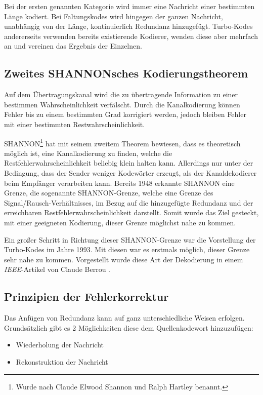 Bei der ersten genannten Kategorie wird immer eine Nachricht einer bestimmten Länge kodiert. Bei Faltungskodes wird hingegen der ganzen Nachricht, unabhängig von der Länge, kontinuierlich Redundanz hinzugefügt. Turbo-Kodes andererseits verwenden bereits existierende Kodierer, wenden diese aber mehrfach an und vereinen das Ergebnis der Einzelnen.

\subsection{Zweites SHANNONsches Kodierungstheorem}
\label{sec:shannonTheorem}
Auf dem Übertragungskanal wird die zu übertragende Information zu einer bestimmen Wahrscheinlichkeit verfälscht. Durch die Kanalkodierung können Fehler bis zu einem bestimmten Grad korrigiert werden, jedoch bleiben Fehler mit einer bestimmten Restwahrscheinlichkeit.

SHANNON\footnote{Wurde nach Claude Elwood Shannon und Ralph Hartley benannt.} hat mit seinem zweitem Theorem bewiesen, dass es theoretisch möglich ist, eine Kanalkodierung zu finden, welche die Restfehlerwahrscheinlichkeit beliebig klein halten kann. Allerdings nur unter der Bedingung, dass der Sender weniger Kodewörter erzeugt, als der Kanaldekodierer beim Empfänger verarbeiten kann. Bereits 1948 erkannte SHANNON eine Grenze, die sogenannte SHANNON-Grenze, welche eine Grenze des Signal/Rausch-Verhältnisses, im Bezug auf die hinzugefügte Redundanz und der erreichbaren Restfehlerwahrscheinlichkeit darstellt. Somit wurde das Ziel gesteckt, mit einer geeigneten Kodierung, dieser Grenze möglichst nahe zu kommen. \cite[S.~125~f.]{schoenfeld2012informations}

Ein großer Schritt in Richtung dieser SHANNON-Grenze war die Vorstellung der Turbo-Kodes im Jahre 1993. Mit diesen war es erstmals möglich, dieser Grenze sehr nahe zu kommen. Vorgestellt wurde diese Art der Dekodierung in einem \emph{IEEE}-Artikel von Claude Berrou \cite{berrou1996near}.

\subsection{Prinzipien der Fehlerkorrektur}
\label{sec:principlesMistakesCorrection}
Das Anfügen von Redundanz kann auf ganz unterschiedliche Weisen erfolgen. Grundsätzlich gibt es 2 Möglichkeiten diese dem Quellenkodewort hinzuzufügen:

\begin{itemize}
\item Wiederholung der Nachricht
\item Rekonstruktion der Nachricht
\end{itemize}

